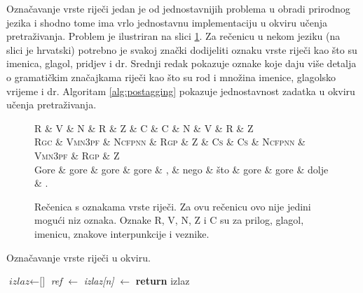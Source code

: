 Označavanje vrste riječi jedan je od jednostavnijih problema u obradi prirodnog
jezika i shodno tome ima vrlo jednostavnu implementaciju u okviru učenja
pretraživanja. Problem je ilustriran na slici \ref{fig:postagging}. Za rečenicu
u nekom jeziku (na slici je hrvatski) potrebno je svakoj znački dodijeliti
oznaku vrste riječi kao što su imenica, glagol, pridjev i dr. Srednji redak
pokazuje oznake koje daju više detalja o gramatičkim značajkama riječi kao što
su rod i množina imenice, glagolsko vrijeme i dr. Algoritam \ref{alg:postagging}
pokazuje jednostavnost zadatka u okviru učenja pretraživanja.

\begin{figure}
\centering
\begin{dependency}
\begin{deptext}
  \textsc{R}   \& \textsc{V}      \& \textsc{N}      \& \textsc{R}   \& \textsc{Z} \& \textsc{C}  \& \textsc{C}  \& \textsc{N}      \& \textsc{V}      \& \textsc{R}   \& \textsc{Z} \\
  \textsc{Rgc} \& \textsc{Vmn3pf} \& \textsc{Ncfpnn} \& \textsc{Rgp} \& \textsc{Z} \& \textsc{Cs} \& \textsc{Cs} \& \textsc{Ncfpnn} \& \textsc{Vmn3pf} \& \textsc{Rgp} \& \textsc{Z} \\
  Gore         \& gore            \& gore            \& gore         \& ,          \& nego        \& što         \& gore            \& gore            \& dolje        \& .          \\
\end{deptext}
\end{dependency}
\caption[Rečenica s oznakama vrste riječi.]{Rečenica s oznakama vrste riječi. Za
ovu rečenicu ovo nije jedini mogući niz oznaka. Oznake R, V, N, Z i C su za
prilog, glagol, imenicu, znakove interpunkcije i veznike.}
\label{fig:postagging}
\end{figure}

\begin{algorithm}
\caption{Označavanje vrste riječi u \lts{} okviru.}\label{alg:postagging}
\begin{algorithmic}[1]
\State $\textit{izlaz} \gets \text{[]}$
  \State \textit{ref} $\gets$ 
  \State \textit{izlaz[n]} $\gets$ 
\EndFor
\State {}
\State \textbf{return} izlaz
\EndFunction
\end{algorithmic}
\end{algorithm}

